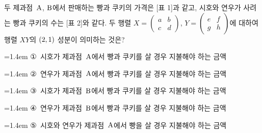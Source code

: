 두 제과점~$\mathrm{A}$, $\mathrm{B}$에서 판매하는 빵과 쿠키의 가격은 [표 1]과 같고, 시호와 연우가 사려는 빵과 쿠키의 수는 [표 2]와 같다. 두 행렬 $X=\begin{pmatrix} a & b \\ c & d \end{pmatrix}$, $Y=\begin{pmatrix} e & f \\ g & h \end{pmatrix}$에 대하여 행렬 $XY$의 $(2{,}\mkern3mu\mathopen{}1)$ 성분이 의미하는 것은?
\par\smallskip\begin{center}\resizebox{\ifdim\width>\linewidth\linewidth\else\width\fi}{!}{}\end{center}
\par\medskip\par\noindent\hangindent=1.4em {\small ①}\ 시호가 제과점~$\mathrm{A}$에서 빵과 쿠키를 살 경우 지불해야 하는 금액\par\noindent\hangindent=1.4em {\small ②}\ 연우가 제과점~$\mathrm{A}$에서 빵과 쿠키를 살 경우 지불해야 하는 금액\par\noindent\hangindent=1.4em {\small ③}\ 시호가 제과점~$\mathrm{B}$에서 빵과 쿠키를 살 경우 지불해야 하는 금액\par\noindent\hangindent=1.4em {\small ④}\ 연우가 제과점~$\mathrm{B}$에서 빵과 쿠키를 살 경우 지불해야 하는 금액\par\noindent\hangindent=1.4em {\small ⑤}\ 시호와 연우가 제과점~$\mathrm{A}$에서 빵을 살 경우 지불해야 하는 금액\par\medskip
